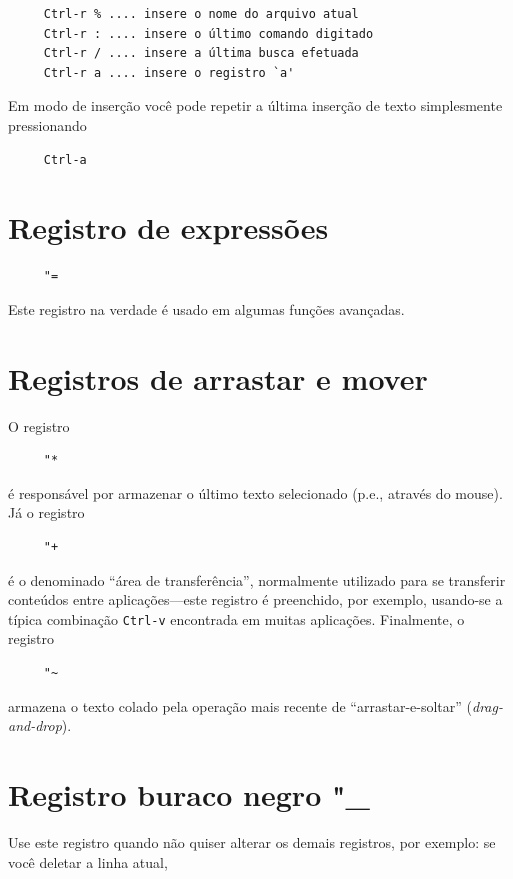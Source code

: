 \documentclass[10pt,a4paper,openany]{book}
\begin{document}
\begin{verbatim}
     Ctrl-r % .... insere o nome do arquivo atual
     Ctrl-r : .... insere o último comando digitado
     Ctrl-r / .... insere a última busca efetuada
     Ctrl-r a .... insere o registro `a'
\end{verbatim}

Em modo de inserção você pode repetir a última inserção de texto
simplesmente pressionando

\begin{verbatim}
     Ctrl-a
\end{verbatim}

\section{Registro de expressões}
\label{Registro de expressões}

\begin{verbatim}
     "=
\end{verbatim}

Este registro na verdade é usado em algumas funções avançadas.

\section{Registros de arrastar e mover}
\label{Registros de arrastar e mover}

O registro 
\begin{verbatim}
     "*
\end{verbatim}
 é responsável por armazenar o último texto selecionado (p.e., através do
mouse). Já o registro 
\begin{verbatim}
     "+
\end{verbatim}
é o denominado ``área de transferência'', normalmente utilizado para se
transferir conteúdos entre aplicações---este registro é preenchido, por
exemplo, usando-se a típica combinação {\tt Ctrl-v} encontrada em muitas
aplicações. Finalmente, o registro 
\begin{verbatim}
     "~
\end{verbatim}
armazena o texto colado pela operação mais recente de ``arrastar-e-soltar''
({\em drag-and-drop}). 

\section{Registro buraco negro "\_}
\label{Registro buraco negro}
Use este registro quando não quiser alterar os demais registros, por exemplo: se você deletar a linha atual,
\end{document}
